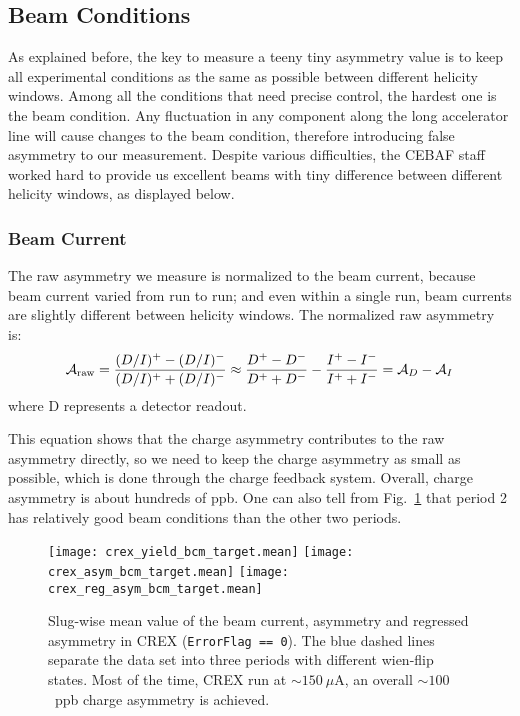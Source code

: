\subsection{Beam Conditions}
As explained before, the key to measure a teeny tiny asymmetry value is to 
keep all experimental conditions as the same as possible between different 
helicity windows. Among all the conditions that need precise control, the 
hardest one is the beam condition. Any fluctuation in any component along the 
long accelerator line will cause changes to the beam condition, therefore introducing false 
asymmetry to our measurement. Despite various difficulties, the CEBAF staff worked 
hard to provide us excellent beams with tiny difference between different helicity 
windows, as displayed below.

\subsubsection{Beam Current}
The raw asymmetry we measure is normalized to the beam current, because beam
current varied from run to run; and even within a single run, beam currents are 
slightly different between helicity windows. The normalized raw asymmetry is:
\begin{equation}
    \mathcal{A}_{\text{raw}} = \frac{(D/I)^+ - (D/I)^-}{(D/I)^+ + (D/I)^-}
	\approx \frac{D^+ - D^-}{D^+ + D^-} - \frac{I^+ - I^-}{I^+ + I^-}
	= \mathcal{A}_D - \mathcal{A}_I
\end{equation}
where D represents a detector readout.

This equation shows that the charge asymmetry contributes to the raw asymmetry directly, 
so we need to keep the charge asymmetry as small as possible, which is done 
through the charge feedback system. Overall, charge asymmetry is about hundreds of ppb. 
One can also tell from Fig.~\ref{fig:crex_bcm_target}
that period 2 has relatively good beam conditions than the other two periods.
\begin{figure}[H]
    \centering
    \texttt{[image: crex\_yield\_bcm\_target.mean]}
    \texttt{[image: crex\_asym\_bcm\_target.mean]}
    \texttt{[image: crex\_reg\_asym\_bcm\_target.mean]}
    \caption{Slug-wise mean value of the beam current, asymmetry and regressed 
    asymmetry in CREX (\texttt{ErrorFlag == 0}). The blue dashed lines separate
    the data set into three periods with different wien-flip states.
    Most of the time, CREX run at $\sim 150\ \mu$A, an overall $\sim 100~$~ppb charge 
    asymmetry is achieved.}
    \label{fig:crex_bcm_target}
\end{figure}

